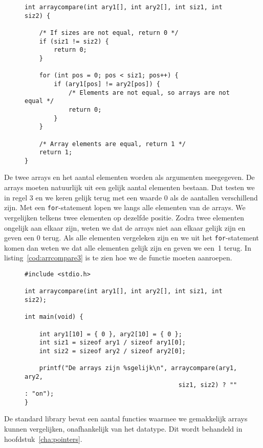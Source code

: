 \begin{figure}[H]
\begin{lstlisting}[caption=Vergelijken van twee arrays.,label=cod:arrcompare2]
int arraycompare(int ary1[], int ary2[], int siz1, int siz2) {

    /* If sizes are not equal, return 0 */
    if (siz1 != siz2) {
        return 0;
    }

	for (int pos = 0; pos < siz1; pos++) {
		if (ary1[pos] != ary2[pos]) {
            /* Elements are not equal, so arrays are not equal */
			return 0;
		}
	}
    
    /* Array elements are equal, return 1 */
	return 1;
}
\end{lstlisting}
\end{figure}

De twee arrays en het aantal elementen worden als argumenten meegegeven. De arrays moeten natuurlijk uit een gelijk aantal elementen bestaan. Dat testen we in regel 3 en we keren gelijk terug met een waarde 0 als de aantallen verschillend zijn. Met een \texttt{for}-statement lopen we langs alle elementen van de arrays. We vergelijken telkens twee elementen op dezelfde positie. Zodra twee elementen ongelijk aan elkaar zijn, weten we dat de arrays niet aan elkaar gelijk zijn en geven een 0 terug. Als alle elementen vergeleken zijn en we uit het \texttt{for}-statement komen dan weten we dat alle elementen gelijk zijn en geven we een~1 terug. In listing~\ref{cod:arrcompare3} is te zien hoe we de functie moeten aanroepen.

\begin{figure}[!ht]
\begin{lstlisting}[caption=Vergelijken van twee arrays.,label=cod:arrcompare3]
#include <stdio.h>

int arraycompare(int ary1[], int ary2[], int siz1, int siz2);
	
int main(void) {

	int ary1[10] = { 0 }, ary2[10] = { 0 };
    int siz1 = sizeof ary1 / sizeof ary1[0];
    int siz2 = sizeof ary2 / sizeof ary2[0];
    
	printf("De arrays zijn %sgelijk\n", arraycompare(ary1, ary2,
                                          siz1, siz2) ? "" : "on");
}
\end{lstlisting}
\end{figure}

De standard library bevat een aantal functies waarmee we gemakkelijk arrays kunnen vergelijken, onafhankelijk van het datatype. Dit wordt behandeld in hoofdstuk~\ref{cha:pointers}.


